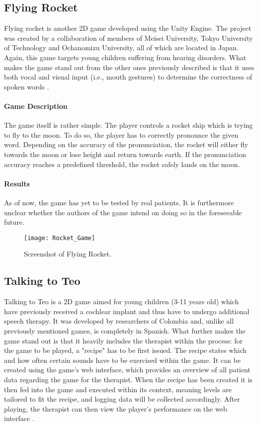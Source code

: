 \documentclass[draft,final]{vutinfth} %
\begin{document}
\subsection{Flying Rocket}
Flying rocket is another 2D game developed using the Unity Engine. The project was created by a collaboration of members of Meisei University, Tokyo University of Technology and Ochanomizu University, all of which are located in Japan. Again, this game targets young children suffering from hearing disorders. What makes the game stand out from the other ones previously described is that it uses both vocal and visual input (i.e., mouth gestures) to determine the correctness of spoken words \cite{takagi2020voice}. 

\paragraph{Game Description} 
The game itself is rather simple. The player controls a rocket ship which is trying to fly to the moon. To do so, the player has to correctly pronounce the given word. Depending on the accuracy of the pronunciation, the rocket will either fly towards the moon or lose height and return towards earth. If the pronunciation accuracy reaches a predefined threshold, the rocket safely lands on the moon.

\paragraph{Results} As of now, the game has yet to be tested by real patients. It is furthermore unclear whether the authors of the game intend on doing so in the foreseeable future.

\begin{figure}
\begin{center}
\texttt{[image: Rocket\_Game]}
\end{center}
\caption{Screenshot of Flying Rocket\cite{takagi2020voice}.}
\end{figure}


\subsection{Talking to Teo}
Talking to Teo is a 2D game aimed for young children (3-11 years old) which have previously received a cochlear implant and thus have to undergo additional speech therapy. It was developed by researchers of Colombia and, unlike all previously mentioned games, is completely in Spanish. What further makes the game stand out is that it heavily includes the therapist within the process: for the game to be played, a "recipe" has to be first issued. The recipe states which and how often certain sounds have to be exercised within the game. It can be created using the game's web interface, which provides an overview of all patient data regarding the game for the therapist. When the recipe has been created it is then fed into the game and executed within its context, meaning levels are tailored to fit the recipe, and logging data will be collected accordingly. After playing, the therapist can then view the player's performance on the web interface \cite{navarro2014talking}. 
\end{document}
